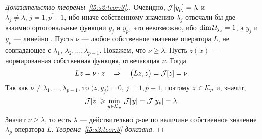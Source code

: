 \begin{proof}[Доказательство теоремы~\ref{l5:s2:teor:3}.]
	Очевидно, $\J[y_p]=\lambda$ и $\lambda_j\neq\lambda,\,j=\overline{1,p-1}$, ибо иначе собственному значению $\lambda_j$ отвечали бы две взаимно ортогональные функции $y_j$ и $y_p$, это невозможно, ибо $\dim\Ul[\lambda_j]=1$, а $y_j$ и $y_p$ --- линейно {}. Пусть $\nu$ --- любое собственное значение оператора $L$, не совпадающее с $\lambda_1,\,\lambda_2,\ldots,\lambda_{p-1}$. Покажем, что $\nu\geqslant\lambda$. Пусть $z(x)$ --- нормированная собственная функция, отвечающая $\nu$. Тогда 
	\begin{equation*}
		 Lz=\nu\cdot z\quad\Rightarrow\quad\big(Lz,z\big)=\J[z]=\nu.
	\end{equation*} 
	Так как $\nu\neq\lambda_1,\ldots,\lambda_{p-1}$, то $\big(z,y_j\big)=0,\,j=\overline{1,p-1}$, поэтому $z\in\K_p$ и, значит,
	\begin{equation*}
		\J[z]\geqslant\min\limits_{y\in\K_p}\,\J[y]=\J[y_p]=\lambda.
	\end{equation*} 
	Значит $\nu\geqslant\lambda$, то есть $\lambda$ --- действительно $p$-ое по величине собственное значение $\lambda_p$ оператора $L$. \emph{Теорема~\ref{l5:s2:teor:3} доказана}. 
\end{proof}

